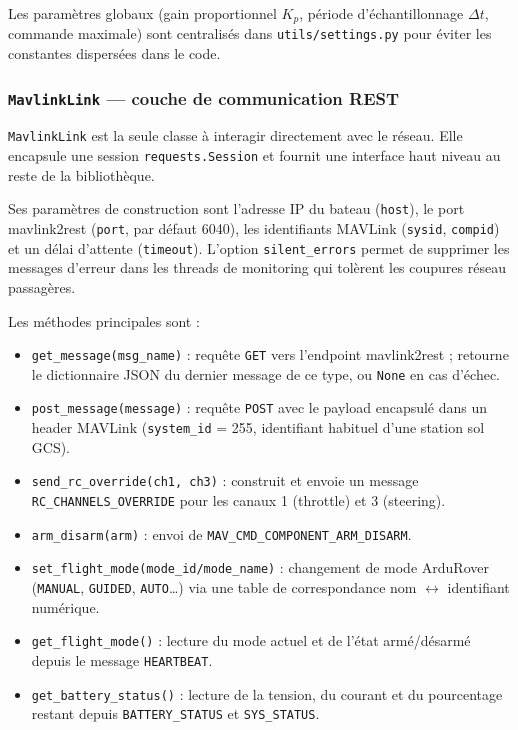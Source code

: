 \noindent Les paramètres globaux (gain proportionnel $K_p$, période d'échantillonnage $\Delta t$, commande maximale) sont centralisés dans \texttt{utils/settings.py} pour éviter les constantes dispersées dans le code.

\subsubsection{\texttt{MavlinkLink} — couche de communication REST}
\label{sec:bblib:mavlinklink}

\texttt{MavlinkLink} est la seule classe à interagir directement avec le réseau. Elle encapsule une session \texttt{requests.Session} et fournit une interface haut niveau au reste de la bibliothèque.

Ses paramètres de construction sont l'adresse IP du bateau (\texttt{host}), le port mavlink2rest (\texttt{port}, par défaut 6040), les identifiants MAVLink (\texttt{sysid}, \texttt{compid}) et un délai d'attente (\texttt{timeout}). L'option \texttt{silent\_errors} permet de supprimer les messages d'erreur dans les threads de monitoring qui tolèrent les coupures réseau passagères.

Les méthodes principales sont :

\begin{itemize}
  \item \texttt{get\_message(msg\_name)} : requête \texttt{GET} vers l'endpoint mavlink2rest ; retourne le dictionnaire JSON du dernier message de ce type, ou \texttt{None} en cas d'échec.
  \item \texttt{post\_message(message)} : requête \texttt{POST} avec le payload encapsulé dans un header MAVLink (\texttt{system\_id} = 255, identifiant habituel d'une station sol GCS).
  \item \texttt{send\_rc\_override(ch1, ch3)} : construit et envoie un message \texttt{RC\_CHANNELS\_OVERRIDE} pour les canaux 1 (throttle) et 3 (steering).
  \item \texttt{arm\_disarm(arm)} : envoi de \texttt{MAV\_CMD\_COMPONENT\_ARM\_DISARM}.
  \item \texttt{set\_flight\_mode(mode\_id/mode\_name)} : changement de mode ArduRover (\texttt{MANUAL}, \texttt{GUIDED}, \texttt{AUTO}…) via une table de correspondance nom $\leftrightarrow$ identifiant numérique.
  \item \texttt{get\_flight\_mode()} : lecture du mode actuel et de l'état armé/désarmé depuis le message \texttt{HEARTBEAT}.
  \item \texttt{get\_battery\_status()} : lecture de la tension, du courant et du pourcentage restant depuis \texttt{BATTERY\_STATUS} et \texttt{SYS\_STATUS}.
\end{itemize}

